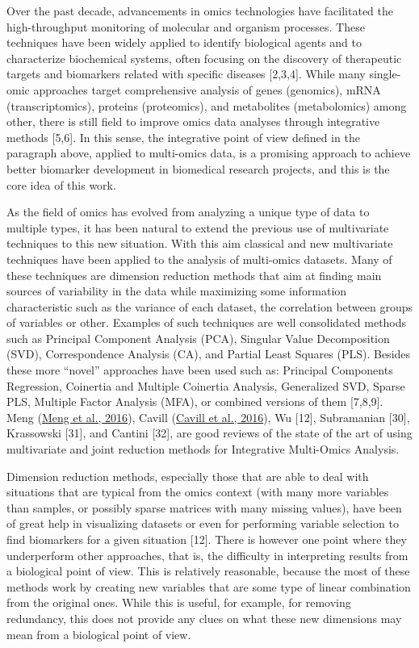 \documentclass[a4paper, nobind]{templates/ociamthesis}
\begin{document}
Over the past decade, advancements in omics technologies have facilitated the high-throughput monitoring of molecular and organism processes. These techniques have been widely applied to identify biological agents and to characterize biochemical systems, often focusing on the discovery of therapeutic targets and biomarkers related with specific diseases {[}2,3,4{]}. While many single-omic approaches target comprehensive analysis of genes (genomics), mRNA (transcriptomics), proteins (proteomics), and metabolites (metabolomics) among other, there is still field to improve omics data analyses through integrative methods {[}5,6{]}. In this sense, the integrative point of view defined in the paragraph above, applied to multi-omics data, is a promising approach to achieve better biomarker development in biomedical research projects, and this is the core idea of this work.

As the field of omics has evolved from analyzing a unique type of data to multiple types, it has been natural to extend the previous use of multivariate techniques to this new situation. With this aim classical and new multivariate techniques have been applied to the analysis of multi-omics datasets. Many of these techniques are dimension reduction methods that aim at finding main sources of variability in the data while maximizing some information characteristic such as the variance of each dataset, the correlation between groups of variables or other. Examples of such techniques are well consolidated methods such as Principal Component Analysis (PCA), Singular Value Decomposition (SVD), Correspondence Analysis (CA), and Partial Least Squares (PLS). Besides these more ``novel'' approaches have been used such as: Principal Components Regression, Coinertia and Multiple Coinertia Analysis, Generalized SVD, Sparse PLS, Multiple Factor Analysis (MFA), or combined versions of them {[}7,8,9{]}. Meng (\protect\hyperlink{ref-meng_dimension_2016}{Meng et al., 2016}), Cavill (\protect\hyperlink{ref-cavill_transcriptomic_2016}{Cavill et al., 2016}), Wu {[}12{]}, Subramanian {[}30{]}, Krassowski {[}31{]}, and Cantini {[}32{]}, are good reviews of the state of the art of using multivariate and joint reduction methods for Integrative Multi-Omics Analysis.

Dimension reduction methods, especially those that are able to deal with situations that are typical from the omics context (with many more variables than samples, or possibly sparse matrices with many missing values), have been of great help in visualizing datasets or even for performing variable selection to find biomarkers for a given situation {[}12{]}. There is however one point where they underperform other approaches, that is, the difficulty in interpreting results from a biological point of view. This is relatively reasonable, because the most of these methods work by creating new variables that are some type of linear combination from the original ones. While this is useful, for example, for removing redundancy, this does not provide any clues on what these new dimensions may mean from a biological point of view.
\end{document}
